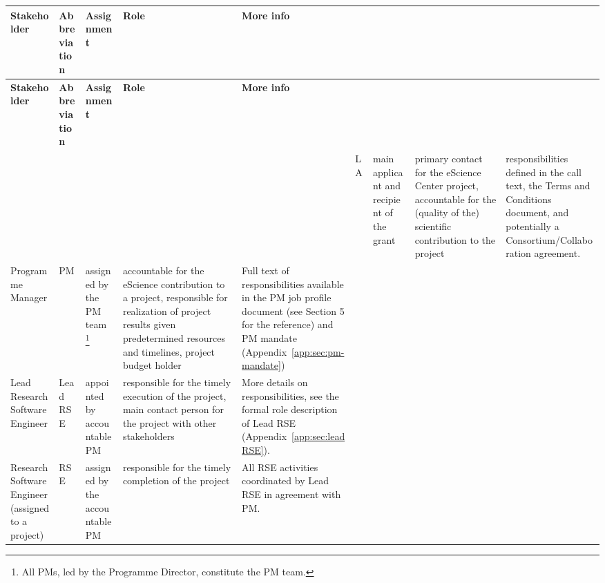 \documentclass[11pt]{article}
\begin{document}
\begin{tabularx}{\linewidth}{p{}|p{}|p{}|p{}|p{}}%
\toprule
\textbf{Stakeholder} & \textbf{Abbreviation} & \textbf{Assignment}& \textbf{Role}& \textbf{More info}\\
\midrule
\endfirsthead
\toprule
\textbf{Stakeholder} & \textbf{Abbreviation} & \textbf{Assignment}& \textbf{Role}& \textbf{More info}\\
\midrule
\endhead
\midrule
\multicolumn{5}{r}{}
\endfoot
\bottomrule
\endlastfoot  
Lead Applicant                                     & LA                    & main applicant and recipient of the grant                                                                         & primary contact for the eScience Center project, accountable for the (quality of the) scientific contribution to the project                                                                                                           & responsibilities defined in the call text, the Terms and Conditions document, and potentially a Consortium/Collaboration agreement.  \\\hline
Programme Manager                                  & PM                    & assigned by the PM team~\footnote{All PMs, led by the Programme Director, constitute the PM team.}                                                                                          & accountable for the eScience contribution to a project, responsible for realization of project results given predetermined resources and timelines, project budget holder                                                              & Full text of responsibilities available in the PM job profile document (see Section 5 for the reference) and PM mandate (Appendix~\ref{app:sec:pm-mandate}) \\\hline
Lead Research Software Engineer                    & Lead RSE              & appointed by accountable PM                                                                                       & responsible for the timely execution of the project, main contact person for the project with other stakeholders                                                                                                                       & More details on responsibilities, see the formal role description of Lead RSE (Appendix~\ref{app:sec:leadRSE}).                                          \\\hline
Research Software Engineer (assigned to a project) & RSE                   & assigned by the accountable PM                                                                                    & responsible for the timely completion of the project                                                                                                                                                                                   & All RSE activities coordinated by Lead RSE in agreement with PM.                                                                     \\\hline

\end{tabularx}
\end{document}
